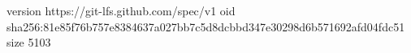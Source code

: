 version https://git-lfs.github.com/spec/v1
oid sha256:81e85f76b757e8384637a027bb7c5d8dcbbd347e30298d6b571692afd04fdc51
size 5103
